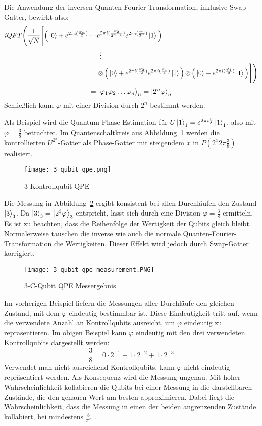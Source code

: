 Die Anwendung der inversen Quanten-Fourier-Transformation, inklusive Swap-Gatter, bewirkt also:
\begin{align*}
iQFT\Bigg(
\frac{1}{\sqrt{N}}
\Bigg[
  \Big(\ket{0} + e^{2\pi i (\frac{\varphi_n}{2})} \dotsb & e^{2\pi i (\frac{\varphi_2}{2^{n-1}})}e^{2\pi i (\frac{\varphi_1}{2^{n}})}\ket{1}\Big) \\
  &\vdotswithin{\tensor}\\
  &\tensor
  \Big(\ket{0} +  e^{2\pi i (\frac{\varphi_2}{2})}e^{2\pi i (\frac{\varphi_1}{4})}\ket{1}\Big) \tensor 
  \Big(\ket{0} + e^{2\pi i (\frac{\varphi_1}{2})}\ket{1}\Big) 
  	\Bigg]
\Bigg)
\end{align*}
\[ = \ket{\varphi_1 \varphi_{2}\dotsc\varphi_n}_n = \ket{2^n\varphi}_n\]
Schließlich kann \(\varphi\) mit einer Division durch \(2^n\) bestimmt werden.

Als Beispiel wird die Quantum-Phase-Estimation für
\(U\ket{1}_1=e^{2\pi i \frac{3}{8}}\ket{1}_1\), 
also mit \(\varphi = \frac{3}{8}\) betrachtet.
Im Quantenschaltkreis aus Abbildung~\ref{fig:3_qubit_qpe} 
werden die kontrollierten \(U^{2^x}\)-Gatter als Phase-Gatter mit steigendem \(x\) in \(P(2^x 2\pi \frac{3}{8})\) realisiert.
\begin{figure}[H]
  \centering
  \texttt{[image: 3\_qubit\_qpe.png]}
  \caption{3-Kontrollqubit QPE}
  \label{fig:3_qubit_qpe}
\end{figure}
Die Messung in Abbildung~\ref{fig:3_qubit_qpe_measurement} ergibt konsistent bei allen Durchläufen den Zustand \(\ket{3}_3\).
Da \(\ket{3}_3 = \ket{2^3\varphi}_3\) entspricht, 
lässt sich durch eine Division \(\varphi = \frac{3}{8}\) ermitteln.
Es ist zu beachten, 
dass die Reihenfolge der Wertigkeit der Qubits gleich bleibt.
Normalerweise tauschen die inverse wie auch die normale Quanten-Fourier-Transformation die Wertigkeiten.
Dieser Effekt wird jedoch durch Swap-Gatter korrigiert.
\begin{figure}[H]
  \centering
  \texttt{[image: 3\_qubit\_qpe\_measurement.PNG]}
  \caption{3-C-Qubit QPE Messergebnis}
  \label{fig:3_qubit_qpe_measurement}
\end{figure}

Im vorherigen Beispiel liefern die Messungen aller Durchläufe den gleichen Zustand, 
mit dem \(\varphi\) eindeutig bestimmbar ist.
Diese Eindeutigkeit tritt auf, 
wenn die verwendete Anzahl an Kontrollqubits ausreicht, 
um \(\varphi\) eindeutig zu repräsentieren.
Im obigen Beispiel kann \(\varphi\) eindeutig mit den drei verwendeten Kontrollqubits dargestellt werden:
\[{\frac{3}{8} =0 \cdot 2^{-1} + 1\cdot2^{-2} + 1\cdot2^{-3}}\]
Verwendet man nicht ausreichend Kontrollqubits, 
kann \(\varphi\) nicht eindeutig repräsentiert werden.
Als Konsequenz wird die Messung ungenau.
Mit hoher Wahrscheinlichkeit kollabieren die Qubits bei einer Messung 
in die darstellbaren Zustände, 
die den genauen Wert am besten approximieren.
Dabei liegt die Wahrscheinlichkeit, dass die Messung in einen der beiden angrenzenden Zustände kollabiert, 
bei mindestens \(\frac{8}{\pi^2}\)~\cite[119]{kaye2007introduction}.

